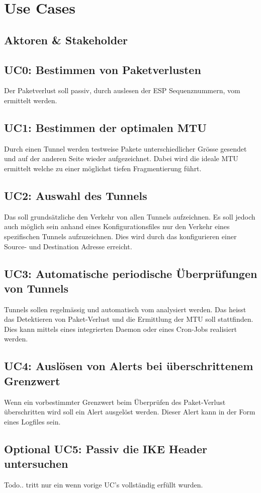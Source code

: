 \section{Use Cases}
\label{sec:Use Cases}


\subsection{Aktoren \& Stakeholder}


\subsection{UC0: Bestimmen von Paketverlusten}
Der Paketverlust soll passiv, durch auslesen der ESP Sequenznummern, vom \tool ermittelt werden.

\subsection{UC1: Bestimmen der optimalen MTU}
Durch einen Tunnel werden testweise Pakete unterschiedlicher Grösse gesendet und auf der anderen Seite wieder aufgezeichnet. Dabei wird die ideale MTU ermittelt welche zu einer möglichst tiefen Fragmentierung führt.

\subsection{UC2: Auswahl des Tunnels}
Das \tool soll grundsätzliche den Verkehr von allen Tunnels aufzeichnen. Es soll jedoch auch möglich sein anhand eines Konfigurationsfiles nur den Verkehr eines spezifischen Tunnels aufzuzeichnen. Dies wird durch das konfigurieren einer Source- und Destination Adresse erreicht.

\subsection{UC3: Automatische periodische Überprüfungen von Tunnels}
Tunnels sollen regelmässig und automatisch vom \tool analysiert werden. Das heisst das Detektieren von Paket-Verlust und die Ermittlung der MTU soll stattfinden. Dies kann mittels eines integrierten Daemon oder eines Cron-Jobs realisiert werden.

\subsection{UC4: Auslösen von Alerts bei überschrittenem Grenzwert}
Wenn ein vorbestimmter Grenzwert beim Überprüfen des Paket-Verlust  überschritten wird soll ein Alert ausgelöst werden. Dieser Alert kann in der Form eines Logfiles sein.

\subsection{Optional UC5: Passiv die IKE Header untersuchen}
Todo.. tritt nur ein wenn vorige UC's vollständig erfüllt wurden.